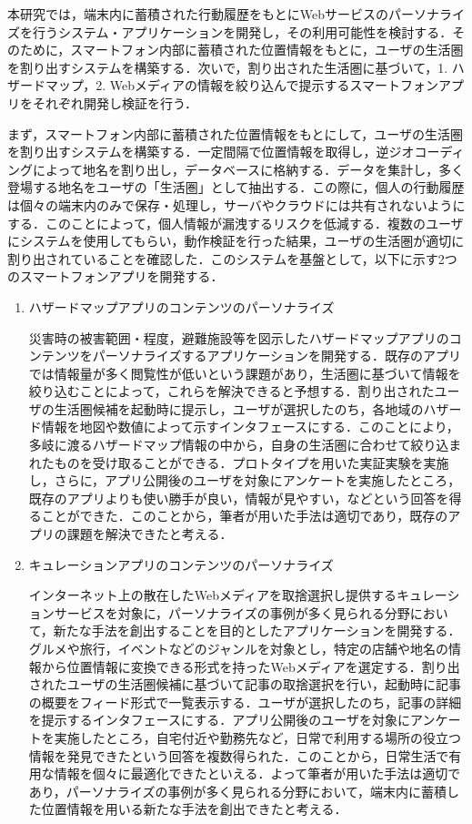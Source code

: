 \documentclass[a4paper]{jsarticle}
\begin{document}
本研究では，端末内に蓄積された行動履歴をもとにWebサービスのパーソナライズを行うシステム・アプリケーションを開発し，その利用可能性を検討する．そのために，スマートフォン内部に蓄積された位置情報をもとに，ユーザの生活圏を割り出すシステムを構築する．次いで，割り出された生活圏に基づいて，1. ハザードマップ，2. Webメディアの情報を絞り込んで提示するスマートフォンアプリをそれぞれ開発し検証を行う．


まず，スマートフォン内部に蓄積された位置情報をもとにして，ユーザの生活圏を割り出すシステムを構築する．一定間隔で位置情報を取得し，逆ジオコーディングによって地名を割り出し，データベースに格納する．データを集計し，多く登場する地名をユーザの「生活圏」として抽出する．この際に，個人の行動履歴は個々の端末内のみで保存・処理し，サーバやクラウドには共有されないようにする．このことによって，個人情報が漏洩するリスクを低減する．複数のユーザにシステムを使用してもらい，動作検証を行った結果，ユーザの生活圏が適切に割り出されていることを確認した．このシステムを基盤として，以下に示す2つのスマートフォンアプリを開発する．
\begin{enumerate}
\item {ハザードマップアプリのコンテンツのパーソナライズ}

災害時の被害範囲・程度，避難施設等を図示したハザードマップアプリのコンテンツをパーソナライズするアプリケーションを開発する．既存のアプリでは情報量が多く閲覧性が低いという課題があり，生活圏に基づいて情報を絞り込むことによって，これらを解決できると予想する．割り出されたユーザの生活圏候補を起動時に提示し，ユーザが選択したのち，各地域のハザード情報を地図や数値によって示すインタフェースにする．このことにより，多岐に渡るハザードマップ情報の中から，自身の生活圏に合わせて絞り込まれたものを受け取ることができる．プロトタイプを用いた実証実験を実施し，さらに，アプリ公開後のユーザを対象にアンケートを実施したところ，既存のアプリよりも使い勝手が良い，情報が見やすい，などという回答を得ることができた．このことから，筆者が用いた手法は適切であり，既存のアプリの課題を解決できたと考える．

\item {キュレーションアプリのコンテンツのパーソナライズ}

インターネット上の散在したWebメディアを取捨選択し提供するキュレーションサービスを対象に，パーソナライズの事例が多く見られる分野において，新たな手法を創出することを目的としたアプリケーションを開発する．グルメや旅行，イベントなどのジャンルを対象とし，特定の店舗や地名の情報から位置情報に変換できる形式を持ったWebメディアを選定する．割り出されたユーザの生活圏候補に基づいて記事の取捨選択を行い，起動時に記事の概要をフィード形式で一覧表示する．ユーザが選択したのち，記事の詳細を提示するインタフェースにする．アプリ公開後のユーザを対象にアンケートを実施したところ，自宅付近や勤務先など，日常で利用する場所の役立つ情報を発見できたという回答を複数得られた．このことから，日常生活で有用な情報を個々に最適化できたといえる．よって筆者が用いた手法は適切であり，パーソナライズの事例が多く見られる分野において，端末内に蓄積した位置情報を用いる新たな手法を創出できたと考える．

\end{enumerate}
\end{document}
